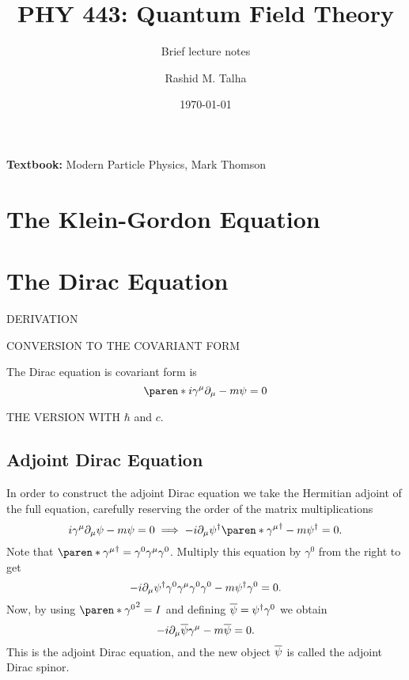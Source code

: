 \documentclass[11pt]{penrose}
\title{PHY 443: Quantum Field Theory}
\subtitle{Brief lecture notes}
\author{Rashid M. Talha}
\affiliation{School of Natural Sciences, NUST}
\date{\today}
\def\apsi{\qbar{\psi}}
\begin{document}
\maketitle

\textbf{Textbook:} Modern Particle Physics, Mark Thomson

\section{The Klein-Gordon Equation}

\section{The Dirac Equation}

DERIVATION

CONVERSION TO THE COVARIANT FORM

The Dirac equation is covariant form is
\begin{equation}
    \paren*{ i\gamma^\mu \pd_\mu - m} \psi = 0
\end{equation}

THE VERSION WITH $\hbar$ and $c$.

\subsection{Adjoint Dirac Equation}
In order to construct the adjoint Dirac equation we take the Hermitian adjoint of the full equation, carefully reserving the order of the matrix multiplications
\begin{equation}
    i \gamma^\mu \pd_\mu \psi - m \psi = 0
    \implies
    -i \pd_\mu \psi^\dagger \paren*{ \gamma^\mu }^\dagger - m \psi^\dagger = 0.
\end{equation}
Note that $\paren*{ \gamma^\mu }^\dagger = \gamma^0 \gamma^\mu \gamma^0$. Multiply this equation by $\gamma^0$ from the right to get
\begin{equation}
    -i \partial_\mu \psi^\dagger \gamma^0 \gamma^\mu \gamma^0 \gamma^0 - m \psi^\dagger \gamma^0 = 0.
\end{equation}
Now, by using $\paren*{\gamma^0}^2 = I$ and defining $\apsi = \psi^\dagger \gamma^0$ we obtain
\begin{equation}
    -i \pd_\mu \apsi \gamma^\mu - m \apsi = 0.
\end{equation}
This is the adjoint Dirac equation, and the new object $\apsi$ is called the adjoint Dirac spinor.
\end{document}
